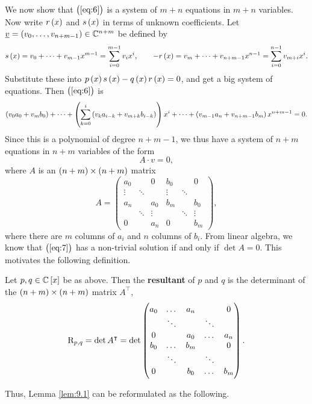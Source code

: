 We now show that $ \br{\ref{eq:6}} $ is a system of $ m + n $ equations in $ m + n $ variables. Now write $ r\br{x} $ and $ s\br{x} $ in terms of unknown coefficients. Let $ \underline{v} = \br{v_0, \dots, v_{n + m - 1}} \in \CC^{n + m} $ be defined by
$$ s\br{x} = v_0 + \dots + v_{m - 1}x^{m - 1} = \sum_{i = 0}^{m - 1} v_ix^i, \qquad -r\br{x} = v_m + \dots + v_{n + m - 1}x^{n - 1} = \sum_{i = 0}^{n - 1} v_{m + i}x^i. $$
Substitute these into $ p\br{x}s\br{x} - q\br{x}r\br{x} = 0 $, and get a big system of equations. Then $ \br{\ref{eq:6}} $ is
$$ \br{v_0a_0 + v_mb_0} + \dots + \br{\sum_{k = 0}^i \br{v_ka_{i - k} + v_{m + k}b_{i - k}}}x^i + \dots + \br{v_{m - 1}a_n + v_{n + m - 1}b_m}x^{n + m - 1} = 0. $$
Since this is a polynomial of degree $ n + m - 1 $, we thus have a system of $ n + m $ equations in $ n + m $ variables of the form
\begin{equation}
\label{eq:7}
A \cdot v = 0,
\end{equation}
where $ A $ is an $ \br{n + m} \times \br{n + m} $ matrix
$$ A =
\begin{pmatrix}
a_0 & & 0 & b_0 & & 0 \\
\vdots & \ddots & & \vdots & \ddots & \\
a_n & & a_0 & b_m & & b_0 \\
& \ddots & \vdots & & \ddots & \vdots \\
0 & & a_n & 0 & & b_m
\end{pmatrix},
$$
where there are $ m $ columns of $ a_i $ and $ n $ columns of $ b_i $. From linear algebra, we know that $ \br{\ref{eq:7}} $ has a non-trivial solution if and only if $ \det A = 0 $. This motivates the following definition.

\begin{definition}
Let $ p, q \in \CC\sbr{x} $ be as above. Then the \textbf{resultant} of $ p $ and $ q $ is the determinant of the $ \br{n + m} \times \br{n + m} $ matrix $ A^\intercal $,
$$ \mathrm{R}_{p, q} = \det A^\intercal = \det
\begin{pmatrix}
a_0 & \dots & a_n & & 0 \\
& \ddots & & \ddots & \\
0 & & a_0 & \dots & a_n \\
b_0 & \dots & b_m & & 0 \\
& \ddots & & \ddots & \\
0 & & b_0 & \dots & b_m
\end{pmatrix}.
$$
\end{definition}

Thus, Lemma \ref{lem:9.1} can be reformulated as the following.

